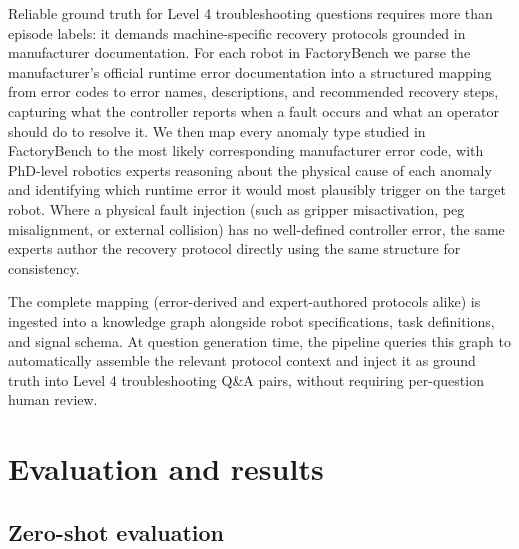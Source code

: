 Reliable ground truth for Level 4 troubleshooting questions requires more than episode labels: it demands machine-specific recovery protocols grounded in manufacturer documentation. For each robot in FactoryBench we parse the manufacturer's official runtime error documentation into a structured mapping from error codes to error names, descriptions, and recommended recovery steps, capturing what the controller reports when a fault occurs and what an operator should do to resolve it. We then map every anomaly type studied in FactoryBench to the most likely corresponding manufacturer error code, with PhD-level robotics experts reasoning about the physical cause of each anomaly and identifying which runtime error it would most plausibly trigger on the target robot. Where a physical fault injection (such as gripper misactivation, peg misalignment, or external collision) has no well-defined controller error, the same experts author the recovery protocol directly using the same structure for consistency.

The complete mapping (error-derived and expert-authored protocols alike) is ingested into a knowledge graph alongside robot specifications, task definitions, and signal schema. At question generation time, the pipeline queries this graph to automatically assemble the relevant protocol context and inject it as ground truth into Level 4 troubleshooting Q\&A pairs, without requiring per-question human review.



\section{Evaluation and results}

\subsection{Zero-shot evaluation}
\label{sec:zero-shot}

